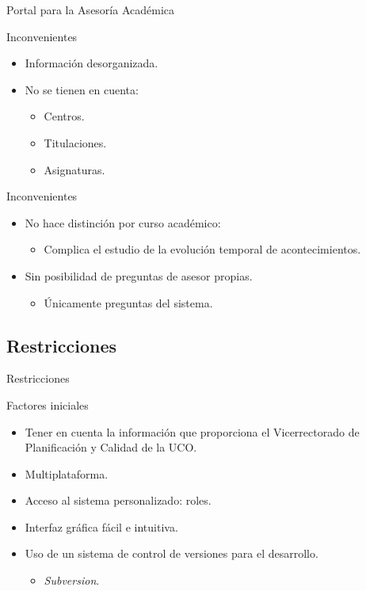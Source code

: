 \documentclass[10pt, hyperref={pdfpagelabels=false}]{beamer}
\begin{document}
      \begin{frame}{Portal para la Asesoría Académica}
        \begin{block}{Inconvenientes}
          \begin{itemize}
           \item Información desorganizada.
           \item No se tienen en cuenta:
           \begin{itemize}
            \item Centros.
            \item Titulaciones.
            \item Asignaturas.
           \end{itemize}
          \end{itemize}
        \end{block}
        \begin{block}{Inconvenientes}
          \begin{itemize}
           \item No hace distinción por curso académico:
           \begin{itemize}
            \item Complica el estudio de la evolución temporal de
                  acontecimientos.
           \end{itemize}
           \item Sin posibilidad de preguntas de asesor propias.
           \begin{itemize}
            \item Únicamente preguntas del sistema.
           \end{itemize}
          \end{itemize}
        \end{block}
      \end{frame}


    \subsection{Restricciones}
      \begin{frame}{Restricciones}
        \begin{block}{Factores iniciales}
          \begin{itemize}
            \item Tener en cuenta la información que proporciona el
                  Vicerrectorado de Planificación y Calidad de la UCO.
            \item Multiplataforma.
            \item Acceso al sistema personalizado: roles.
            \item Interfaz gráfica fácil e intuitiva.
            \item Uso de un sistema de control de versiones para el desarrollo.
            \begin{itemize}
            \item \textit{Subversion}.
            \end{itemize}
          \end{itemize}
        \end{block}
      \end{frame}
\end{document}
